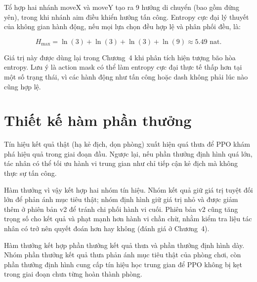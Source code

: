 \newpage
Tổ hợp hai nhánh moveX và moveY tạo ra 9 hướng di chuyển (bao gồm đứng yên), trong khi nhánh aim điều khiển hướng tấn công. Entropy cực đại lý thuyết của không gian hành động, nếu mọi lựa chọn đều hợp lệ và phân phối đều, là:

\begin{equation}
    H_{\max} = \ln(3) + \ln(3) + \ln(3) + \ln(9) \approx 5.49 \text{ nat}.
    \label{eq:max_entropy}
\end{equation}

Giá trị này được dùng lại trong Chương~4 khi phân tích hiện tượng bão hòa entropy. Lưu ý là action mask có thể làm entropy cực đại thực tế thấp hơn tại một số trạng thái, vì các hành động như tấn công hoặc dash không phải lúc nào cũng hợp lệ.

\section{Thiết kế hàm phần thưởng}

Tín hiệu kết quả thật (hạ kẻ địch, dọn phòng) xuất hiện quá thưa để PPO khám phá hiệu quả trong giai đoạn đầu. Ngược lại, nếu phần thưởng định hình quá lớn, tác nhân có thể tối ưu hành vi trung gian như chỉ tiếp cận kẻ địch mà không thực sự tấn công.

Hàm thưởng vì vậy kết hợp hai nhóm tín hiệu. Nhóm kết quả giữ giá trị tuyệt đối lớn để phản ánh mục tiêu thật; nhóm định hình giữ giá trị nhỏ và được giảm thêm ở phiên bản v2 để tránh chi phối hành vi cuối. Phiên bản v2 cũng tăng trọng số cho kết quả và phạt mạnh hơn hành vi chần chừ, nhằm kiểm tra liệu tác nhân có trở nên quyết đoán hơn hay không (đánh giá ở Chương~4).

Hàm thưởng kết hợp phần thưởng kết quả thưa và phần thưởng định hình dày. Nhóm phần thưởng kết quả thưa phản ánh mục tiêu thật của phòng chơi, còn phần thưởng định hình cung cấp tín hiệu học trung gian để PPO không bị kẹt trong giai đoạn chưa từng hoàn thành phòng.

